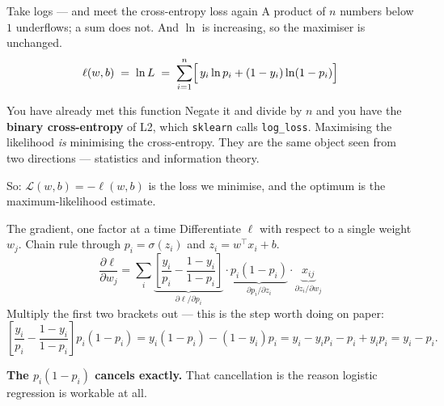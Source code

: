 \documentclass[aspectratio=169]{beamer}
\begin{document}
\begin{frame}[shrink=8]{Take logs --- and meet the cross-entropy loss again}
  A product of $n$ numbers below $1$ underflows; a sum does not. And
  $\ln$ is increasing, so the maximiser is unchanged.
  \[
    \ell(w,b) \;=\; \ln L \;=\;
    \sum_{i=1}^{n}\Bigl[\, y_i \ln p_i + (1-y_i)\ln(1-p_i)\Bigr]
  \]
  \begin{alertblock}{You have already met this function}
    \small Negate it and divide by $n$ and you have the \textbf{binary
    cross-entropy} of L2, which \texttt{sklearn} calls
    \texttt{log\_loss}. Maximising the likelihood \emph{is} minimising the
    cross-entropy. They are the same object seen from two directions ---
    statistics and information theory.
  \end{alertblock}
  \begin{center}\small
    So: $\mathcal{L}(w,b) = -\ell(w,b)$ is the loss we minimise, and the
    optimum is the maximum-likelihood estimate.
  \end{center}
\end{frame}

\begin{frame}[shrink=10]{The gradient, one factor at a time}
  Differentiate $\ell$ with respect to a single weight $w_j$. Chain rule
  through $p_i = \sigma(z_i)$ and $z_i = w^{\!\top}x_i + b$.
  \[
    \frac{\partial \ell}{\partial w_j}
    = \sum_i \underbrace{\left[\frac{y_i}{p_i}
      - \frac{1-y_i}{1-p_i}\right]}_{\partial \ell / \partial p_i}
      \cdot \underbrace{p_i(1-p_i)}_{\partial p_i/\partial z_i}
      \cdot \underbrace{x_{ij}}_{\partial z_i/\partial w_j}
  \]
  Multiply the first two brackets out --- this is the step worth doing on
  paper:
  \[
    \left[\frac{y_i}{p_i} - \frac{1-y_i}{1-p_i}\right] p_i(1-p_i)
    = y_i(1-p_i) - (1-y_i)p_i
    = y_i - y_ip_i - p_i + y_ip_i
    = y_i - p_i .
  \]
  \begin{center}
    \textbf{The $p_i(1-p_i)$ cancels exactly.} That cancellation is the
    reason logistic regression is workable at all.
  \end{center}
\end{frame}
\end{document}
